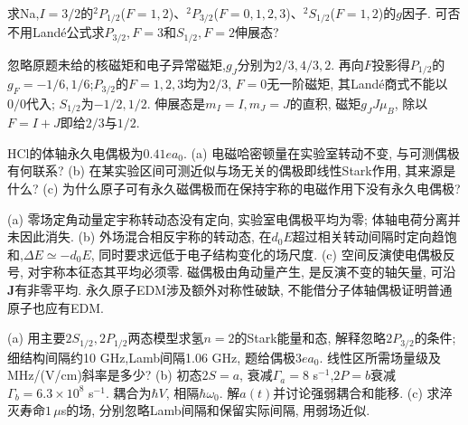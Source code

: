 \begin{exercise}求Na,$I=3/2$的$^2P_{1/2}$($F=1,2$)、$^2P_{3/2}$($F=0,1,2,3$)、$^2S_{1/2}$($F=1,2$)的$g$因子. 可否不用Landé公式求$P_{3/2},F=3$和$S_{1/2},F=2$伸展态?\end{exercise}
\begin{solution}忽略原题未给的核磁矩和电子异常磁矩,$g_J$分别为$2/3,4/3,2$. 再向$F$投影得$P_{1/2}$的$g_F=-1/6,1/6$;$P_{3/2}$的$F=1,2,3$均为$2/3$, $F=0$无一阶磁矩, 其Landé商式不能以$0/0$代入; $S_{1/2}$为$-1/2,1/2$. 伸展态是$m_I=I,m_J=J$的直积, 磁矩$g_JJ\mu_B$, 除以$F=I+J$即给$2/3$与$1/2$.
\end{solution}

\begin{exercise}HCl的体轴永久电偶极为$0.41ea_0$. (a) 电磁哈密顿量在实验室转动不变, 与可测偶极有何联系? (b) 在某实验区间可测近似与场无关的偶极即线性Stark作用, 其来源是什么? (c) 为什么原子可有永久磁偶极而在保持宇称的电磁作用下没有永久电偶极?\end{exercise}
\begin{solution}(a) 零场定角动量定宇称转动态没有定向, 实验室电偶极平均为零; 体轴电荷分离并未因此消失. (b) 外场混合相反宇称的转动态, 在$d_0E$超过相关转动间隔时定向趋饱和,$\Delta E\simeq-d_0E$, 同时要求远低于电子结构变化的场尺度. (c) 空间反演使电偶极反号, 对宇称本征态其平均必须零. 磁偶极由角动量产生, 是反演不变的轴矢量, 可沿$\mathbf J$有非零平均. 永久原子EDM涉及额外对称性破缺, 不能借分子体轴偶极证明普通原子也应有EDM.
\end{solution}
\begin{exercise}(a) 用主要$2S_{1/2},2P_{1/2}$两态模型求氢$n=2$的Stark能量和态, 解释忽略$2P_{3/2}$的条件; 细结构间隔约10 GHz,Lamb间隔1.06 GHz, 题给偶极$3ea_0$. 线性区所需场量级及MHz/(V/cm)斜率是多少? (b) 初态$2S=a$, 衰减$\Gamma_a=8$ s$^{-1}$,$2P=b$衰减$\Gamma_b=6.3\times10^8$ s$^{-1}$. 耦合为$\hbar V$, 相隔$\hbar\omega_0$. 解$a(t)$并讨论强弱耦合和能移. (c) 求淬灭寿命$1\,\mu$s的场, 分别忽略Lamb间隔和保留实际间隔, 用弱场近似.\end{exercise}
